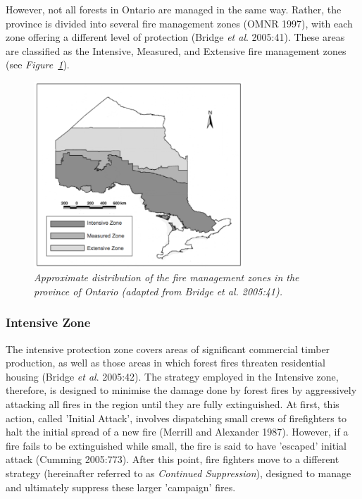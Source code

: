 \begin{spacing}{1.5}
\noindent However, not all forests in Ontario are managed in the same way. Rather, the province is divided into several fire management zones (OMNR 1997), with each zone offering a different level of protection (Bridge \emph{et al}. 2005:41). These areas are classified as the Intensive, Measured, and Extensive fire management zones (see \emph{Figure~\ref{fig2}}). \\

\begin{figure}[h!]
  \centering
    \includegraphics[width=0.7\textwidth]{media/fig2}
      \caption[Distribution of fire management zones in Ontario]{\emph{Approximate distribution of the fire management zones in the province of Ontario (adapted from Bridge \emph{et al}. 2005:41).}}
        \label{fig2}
\end{figure}

\subsubsection{Intensive Zone}
The intensive protection zone covers areas of significant commercial timber production, as well as those areas in which forest fires threaten residential housing (Bridge \emph{et al}. 2005:42). The strategy employed in the Intensive zone, therefore, is designed to minimise the damage done by forest fires by aggressively attacking all fires in the region until they are fully extinguished. At first, this action, called 'Initial Attack', involves dispatching small crews of firefighters to halt the initial spread of a new fire (Merrill and Alexander 1987). However, if a fire fails to be extinguished while small, the fire is said to have 'escaped' initial attack (Cumming 2005:773). After this point, fire fighters move to a different strategy (hereinafter referred to as \emph{Continued Suppression}), designed to manage and ultimately suppress these larger 'campaign' fires.


\end{spacing}
